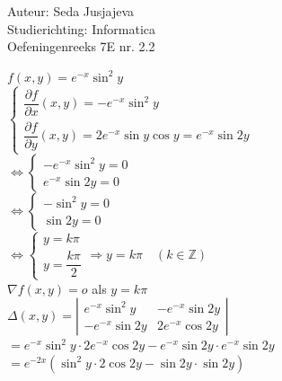 \documentclass[a4paper]{article}
\begin{document}
\noindent \large Auteur: Seda Jusjajeva\\
\noindent \large Studierichting: Informatica\\
\noindent \large Oefeningenreeks 7E nr. 2.2\\

\medskip

\normalsize



$f(x, y) = e^{-x}\sin^2y$ \\

$\left\{\begin{array}{l}
	\dfrac{\partial f}{\partial x}(x, y) = -e^{-x}\sin^2y \\
	\dfrac{\partial f}{\partial y}(x, y) = 2e^{-x}\sin y\cos y = e^{-x}\sin 2y
\end{array}\right.$ \\

$\Leftrightarrow\left\{\begin{array}{l}
    -e^{-x}\sin^2y = 0 \\
    e^{-x}\sin 2y = 0
\end{array}\right.$ \\

$\Leftrightarrow\left\{\begin{array}{l}
    -\sin^2y = 0 \\
    \sin 2y = 0
\end{array}\right.$ \\

$\Leftrightarrow\left\{\begin{array}{l}
    y = k\pi            \\
    y = \dfrac{k\pi}{2}
\end{array}\right. \Rightarrow y = k\pi \quad \left(k \in \mathbb{Z}\right)$ \\


$\nabla f(x, y) = o$ als $ y = k\pi$ \\

$\Delta(x, y) = \left|\begin{array}{cc}
    e^{-x}\sin^2y  & -e^{-x}\sin 2y \\
    -e^{-x}\sin 2y & 2e^{-x}\cos 2y
\end{array}\right|$ \\

$= e^{-x}\sin^2y \cdot 2e^{-x}\cos 2y - e^{-x}\sin 2y \cdot e^{-x}\sin 2y$ \\

$= e^{-2x}\left(\sin^2y \cdot 2\cos 2y - \sin 2y \cdot \sin 2y\right)$ \\
\end{document}
